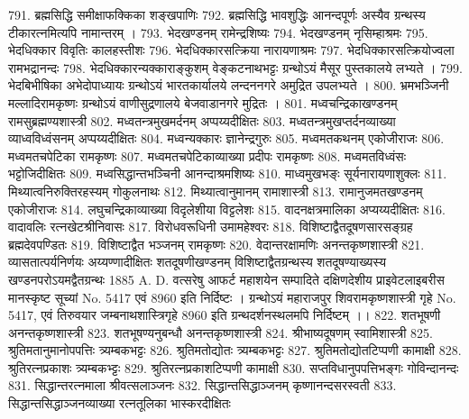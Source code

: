 791. ब्रह्मसिद्धि समीक्षाफक्किका 			शङ्खपाणिः
792. ब्रह्मसिद्धि भावशुद्धिः					आनन्दपूर्णः
		अस्यैव ग्रन्थस्य टीकारत्नमित्यपि नामान्तरम् । 
793. भेदखण्डनम्							रामेन्द्रशिष्यः 
794. भेदखण्डनम् 							नृसिम्हाश्रमः
795. भेदधिक्कार विवृतिः					कालहस्तीशः
796. भेदधिक्कारसत्क्रिया 					नारायणाश्रमः 
797. भेदधिक्कारसत्क्रियोज्वला			रामभद्रानन्दः
798. भेदधिक्कारन्यक्काराङ्कुशम्			वेङ्कटनाथभट्टः
		ग्रन्थोऽयं मैसूर पुस्तकालये लभ्यते ।
799. भेदबिभीषिका							अभेदोपाध्यायः
		ग्रन्थोऽयं भारतकार्यालये लन्दननगरे अमुद्रित उपलभ्यते । 
800. भ्रमभञ्जिनी								मल्लादिरामकृष्णः 
		ग्रन्थोऽयं वाणीसुद्रणालये बेजवाडानगरे मुद्रितः । 
801. मध्वचन्द्रिकाखण्डनम् 					रामसुब्रह्मण्यशास्त्री
802. मध्वतन्त्रमुखमर्दनम्					अप्पय्यदीक्षितः
803. मध्वतन्त्रमुखप्तर्दनव्याख्या व्याध्वविध्वंसनम्	अप्पय्यदीक्षितः
804. मध्वन्यक्कारः							ज्ञानेन्द्रगुरुः
805. मध्वमतकथनम्						एकोजीराजः
806. मध्वमतचपेटिका						रामकृष्णः
807. मध्वमतचपेटिकाव्याख्या प्रदीपः		रामकृष्णः
808. मध्वमतविध्वंसः						भट्टोजिदीक्षितः 
809. मध्वसिद्धान्तभञ्चिनी					आनन्दाश्रमशिष्यः
810. माध्वमुखभङ्ः							सूर्यनारायणाशुक्लः
811. मिथ्यात्वनिरुक्तिरहस्यम् 				गोकुलनाथः
812. मिथ्यात्वानुमानम् 						रामाशास्त्री
813. रामानुजमतखण्डनम् 					एकोजीराजः 
814. लघुचन्द्रिकाव्याख्या विदृलेशीया		विट्टलेशः
815. वादनक्षत्रमालिका						अप्यय्यदीक्षितः
816. वादावलिः								रत्नखेटश्रीनिवासः
817. विरोधवरूधिनी							उमामहेश्वरः
818. विशिष्टाद्वैतदूषणसारसङ्ग्रह			ब्रह्मदेवपण्डितः 
819. विशिष्टाद्वैत भञ्जनम्						रामकृष्णः
820. वेदान्तरक्षामणिः 						अनन्तकृष्णशास्त्री
821. व्यासतात्पर्यनिर्णयः					अय्यण्णादीक्षितः
		शतदूषणीखण्डनम् 
		विशिष्टाद्वैतग्रन्थस्य शतदूषण्याख्यस्य खण्डनपरोऽयमद्वैतग्रन्थः 1885 A. D. वत्सरेषु आफर्ट महाशयेन सम्पादिते दक्षिणदेशीय प्राइवेटलाइबरीस मानस्कृष्ट सूच्यां No. 5417 एवं  8960 इति निर्दिष्टः । ग्रन्थोऽयं महाराजपुर शिवरामकृष्णशास्त्री गृहे No. 5417, एवं तिरुवयार जम्बनाथशास्त्रिगृहे 8960 इति ग्रन्थदर्शनस्थलमपि निर्दिष्टम् ।। 
822. शतभूषणी								अनन्तकृष्णशास्त्री
823. शतभूषण्यनुबन्धौ						अनन्तकृष्णशास्त्री
824. श्रीभाष्यदूषणम्						स्वामिशास्त्री
825. श्रुतिमतानुमानोपपत्तिः				त्र्यम्बकभट्टः
826.	श्रुतिमतोद्योतः							त्र्यम्बकभट्टः
827. श्रुतिमतोद्योतटिप्पणी					कामाक्षी
828. श्रुतिरत्नप्रकाशः						त्र्यम्बकभ्ट्टः
829. श्रुतिरत्नप्रकाशटिप्पणी				कामाक्षी
830. सप्तविधानुपपत्तिभङ्गः					गोविन्दानन्दः 
831. सिद्धान्तरत्नमाला						श्रीवत्सलाञ्जनः
832. सिद्धान्तसिद्धाञ्जनम् 					कृष्णानन्दसरस्वती
833. सिद्धान्तसिद्धाञ्जनव्याख्या	रत्नतूलिका भास्करदीक्षितः 
